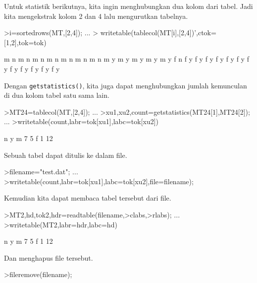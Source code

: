 \documentclass[a4paper,11pt,oneside,enabledeprecatedfontcommands]{scrbook}
\newenvironment{eulernotebook}{}{}
\newenvironment{eulercomment}{\par\medskip\noindent}{\par\medskip}
\begin{document}
\begin{eulernotebook}
		\begin{eulercomment}
			Untuk statistik berikutnya, kita ingin menghubungkan dua kolom dari tabel. Jadi kita mengekstrak
			kolom 2 dan 4 lalu mengurutkan tabelnya.
		\end{eulercomment}
		\begin{eulerprompt}
			>i=sortedrows(MT,[2,4]);  ...
			>  writetable(tablecol(MT[i],[2,4])',ctok=[1,2],tok=tok)
		\end{eulerprompt}
		\begin{euleroutput}
			         m         n
			         m         n
			         m         n
			         m         n
			         m         n
			         m         n
			         m         n
			         m         y
			         m         y
			         m         y
			         m         y
			         m         y
			         f         n
			         f         y
			         f         y
			         f         y
			         f         y
			         f         y
			         f         y
			         f         y
			         f         y
			         f         y
			         f         y
			         f         y
			         f         y
		\end{euleroutput}
		\begin{eulercomment}
			Dengan \texttt{getstatistics()}, kita juga dapat menghubungkan jumlah kemunculan di dua kolom tabel satu sama
			lain.
		\end{eulercomment}
		\begin{eulerprompt}
			>MT24=tablecol(MT,[2,4]); ...
			>{xu1,xu2,count}=getstatistics(MT24[1],MT24[2]); ...
			>writetable(count,labr=tok[xu1],labc=tok[xu2])
		\end{eulerprompt}
		\begin{euleroutput}
			                   n         y
			         m         7         5
			         f         1        12
		\end{euleroutput}
		\begin{eulercomment}
			Sebuah tabel dapat ditulis ke dalam file.
		\end{eulercomment}
		\begin{eulerprompt}
			>filename="test.dat"; ...
			>writetable(count,labr=tok[xu1],labc=tok[xu2],file=filename);
		\end{eulerprompt}
		\begin{eulercomment}
			Kemudian kita dapat membaca tabel tersebut dari file.
		\end{eulercomment}
		\begin{eulerprompt}
			>{MT2,hd,tok2,hdr}=readtable(filename,>clabs,>rlabs); ...
			>writetable(MT2,labr=hdr,labc=hd)
		\end{eulerprompt}
		\begin{euleroutput}
			                   n         y
			         m         7         5
			         f         1        12
		\end{euleroutput}
		\begin{eulercomment}
			Dan menghapus file tersebut.
		\end{eulercomment}
		\begin{eulerprompt}
			>fileremove(filename);
		\end{eulerprompt}
		

\end{eulernotebook}
\end{document}
